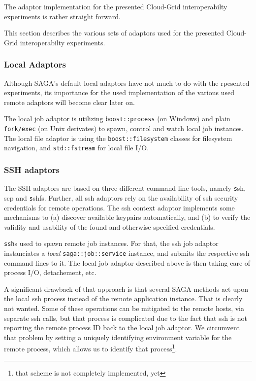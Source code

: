 \documentclass[conference,final]{IEEEtran}
\newcommand{\T}[1]{\texttt{#1}}
\newcommand{\I}[1]{\textit{#1}}
\newcommand{\ssh}[1]{\texttt{ssh}}
\begin{document}

 The adaptor implementation for the presented Cloud-Grid
 interoperabilty experiments is rather straight forward. 
 
 This section describes the various sets of adaptors used for the
 presented Cloud-Grid interoperabilty experiments.  


 \subsubsection{Local Adaptors}

  Although SAGA's default local adaptors have not much to do with the
  rpesented experiments, its importance for the used implementation of
  the various used remote adaptors will become clear later on.

  The local job adaptor is utilizing \T{boost::process} (on Windows)
  and plain \T{fork/exec} (on Unix derivates) to spawn, control and
  watch local job instances.  The local file adaptor is using the
  \T{boost::filesystem} classes for filesystem navigation, and
  \T{std::fstream} for local file I/O. %


 \subsubsection{SSH adaptors}

 The SSH adaptors are based on three different command line tools,
 namely {\texttt ssh, scp} and {\texttt sshfs}.  Further, all ssh
 adaptors rely on the availability of ssh security credentials for
 remote operations.  The ssh context adaptor implements some
 mechanisms to (a) discover available keypairs automatically, and (b)
 to verify the validity and usability of the found and otherwise
 specified credentials.
  
  \ssh is used to spawn remote job instances.  For that, the ssh job
  adaptor instanciates a \I{local} \T{saga::job::service} instance,
  and submits the respective ssh command lines to it.  The local job
  adaptor described above is then taking care of process I/O,
  detachement, etc.

  A significant drawback of that approach is that several SAGA methods
  act upon the local ssh process instead of the remote application
  instance.  That is clearly not wanted.  Some of these operations can
  be mitigated to the remote hosts, via separate ssh calls, but that
  process is complicated due to the fact that ssh is not reporting the
  remote process ID back to the local job adaptor.  We circumvent that
  problem by setting a uniquely identifying environment variable for
  the remote process, which allows us to identify that
  process\footnote{that scheme is not completely implemented, yet}.
\end{document}
